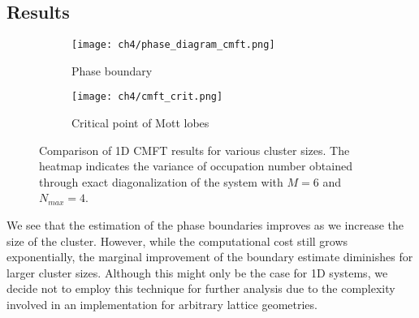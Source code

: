 \subsection{Results}

\begin{figure}[!htb]
    \centering
    \begin{subfigure}[b]{0.6\textwidth}  %
        \centering
        \texttt{[image: ch4/phase\_diagram\_cmft.png]}
        \caption{Phase boundary}
    \end{subfigure}
    \hspace{1em}  %
    \begin{subfigure}[b]{0.3\textwidth}
        \centering
        \texttt{[image: ch4/cmft\_crit.png]}
        \caption{Critical point of Mott lobes}
    \end{subfigure}
    \caption{Comparison of 1D CMFT results for various cluster sizes. The heatmap indicates the variance of occupation number obtained through exact diagonalization of the system with $M=6$ and $N_{max}=4$.}
    \label{}
\end{figure}
\FloatBarrier \!\!\!\!\!\!\!\!\!\!\!

We see that the estimation of the phase boundaries improves as we increase the size of the cluster. However, while the computational cost still grows exponentially, the marginal improvement of the boundary estimate diminishes for larger cluster sizes. Although this might only be the case for 1D systems, we decide not to employ this technique for further analysis due to the complexity involved in an implementation for arbitrary lattice geometries. 